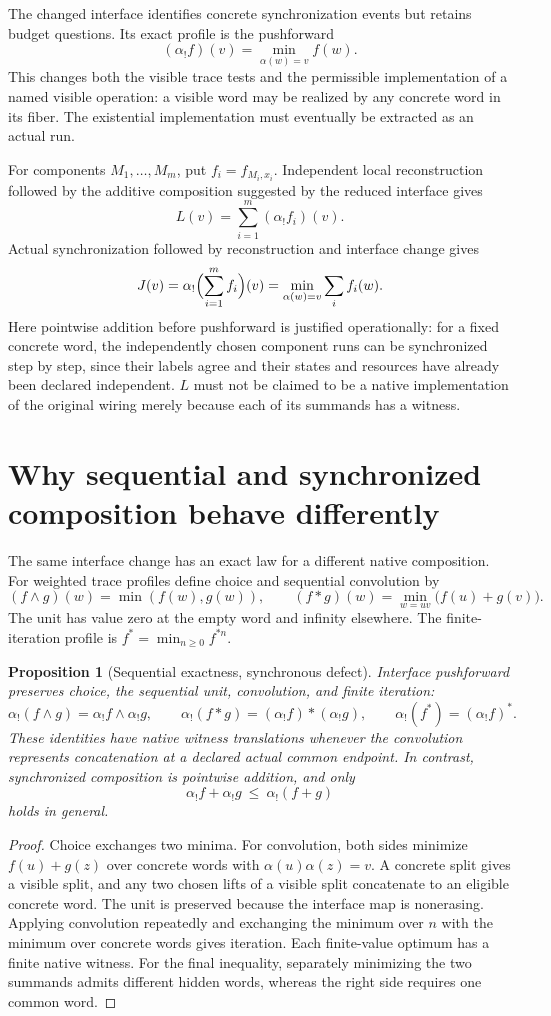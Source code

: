 \documentclass[11pt]{article}
\newtheorem{proposition}[theorem]{Proposition}
\begin{document}
The changed interface identifies concrete synchronization events but retains budget questions. Its exact profile is the pushforward
\[
 (\alpha_! f)(v)=\min_{\alpha(w)=v}f(w).
\]
This changes both the visible trace tests and the permissible implementation of a named visible operation: a visible word may be realized by any concrete word in its fiber. The existential implementation must eventually be extracted as an actual run.

For components $M_1,\ldots,M_m$, put $f_i=f_{M_i,x_i}$. Independent local reconstruction followed by the additive composition suggested by the reduced interface gives
\[
 L(v)=\sum_{i=1}^m(\alpha_!f_i)(v).
\]
Actual synchronization followed by reconstruction and interface change gives
\[
 J(v)=\alpha_!\Bigl(\sum_{i=1}^m f_i\Bigr)(v)
      =\min_{\alpha(w)=v}\sum_i f_i(w).
\]
Here pointwise addition before pushforward is justified operationally: for a fixed concrete word, the independently chosen component runs can be synchronized step by step, since their labels agree and their states and resources have already been declared independent. $L$ must not be claimed to be a native implementation of the original wiring merely because each of its summands has a witness.

\section{Why sequential and synchronized composition behave differently}
The same interface change has an exact law for a different native composition. For weighted trace profiles define choice and sequential convolution by
\[
 (f\wedge g)(w)=\min(f(w),g(w)),\qquad
 (f*g)(w)=\min_{w=uv}\bigl(f(u)+g(v)\bigr).
\]
The unit has value zero at the empty word and infinity elsewhere. The finite-iteration profile is $f^*=\min_{n\geq0}f^{*n}$.

\begin{proposition}[Sequential exactness, synchronous defect]\label{prop:two-products}
Interface pushforward preserves choice, the sequential unit, convolution, and finite iteration:
\[
 \alpha_!(f\wedge g)=\alpha_!f\wedge\alpha_!g,\qquad
 \alpha_!(f*g)=(\alpha_!f)*(\alpha_!g),\qquad
 \alpha_!(f^*)=(\alpha_!f)^*.
\]
These identities have native witness translations whenever the convolution represents concatenation at a declared actual common endpoint. In contrast, synchronized composition is pointwise addition, and only
\[
 \alpha_!f+\alpha_!g\ \leq\ \alpha_!(f+g)
\]
holds in general.
\end{proposition}
\begin{proof}
Choice exchanges two minima. For convolution, both sides minimize $f(u)+g(z)$ over concrete words with $\alpha(u)\alpha(z)=v$. A concrete split gives a visible split, and any two chosen lifts of a visible split concatenate to an eligible concrete word. The unit is preserved because the interface map is nonerasing. Applying convolution repeatedly and exchanging the minimum over $n$ with the minimum over concrete words gives iteration. Each finite-value optimum has a finite native witness. For the final inequality, separately minimizing the two summands admits different hidden words, whereas the right side requires one common word.
\end{proof}
\end{document}
